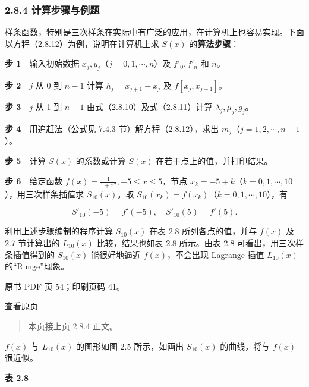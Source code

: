 \subsubsection{2.8.4 计算步骤与例题}\label{ch02b-ux8ba1ux7b97ux6b65ux9aa4ux4e0eux4f8bux9898}

样条函数，特别是三次样条在实际中有广泛的应用，在计算机上也容易实现。下面以方程（2.8.12）为例，说明在计算机上求 \(S(x)\) 的\textbf{算法步骤}：

\textbf{步 1}　输入初始数据 \(x_j,y_j\)（\(j=0,1,\cdots,n\)）及 \(f'_0,f'_n\) 和 \(n\)。

\textbf{步 2}　\(j\) 从 0 到 \(n-1\) 计算 \(h_j=x_{j+1}-x_j\) 及 \(f[x_j,x_{j+1}]\)。

\textbf{步 3}　\(j\) 从 1 到 \(n-1\) 由式（2.8.10）及式（2.8.11）计算 \(\lambda_j,\mu_j,g_j\)。

\textbf{步 4}　用追赶法（公式见 7.4.3 节）解方程（2.8.12），求出 \(m_j\)（\(j=1,2,\cdots,n-1\)）。

\textbf{步 5}　计算 \(S(x)\) 的系数或计算 \(S(x)\) 在若干点上的值，并打印结果。

\textbf{步 6}　给定函数 \(f(x)=\frac1{1+x^2},-5\leqslant x\leqslant5\)，节点 \(x_k=-5+k\)（\(k=0,1,\cdots,10\)），用三次样条插值求 \(S_{10}(x)\)。取 \(S_{10}(x_k)=f(x_k)\)（\(k=0,1,\cdots,10\)），有

\[S'_{10}(-5)=f'(-5),\quad S'_{10}(5)=f'(5).\]

利用上述步骤编制的程序计算 \(S_{10}(x)\) 在表 2.8 所列各点的值，并与 \(f(x)\) 及 2.7 节计算出的 \(L_{10}(x)\) 比较，结果也如表 2.8 所示。由表 2.8 可看出，用三次样条插值得到的 \(S_{10}(x)\) 能很好地逼近 \(f(x)\)，不会出现 Lagrange 插值 \(L_{10}(x)\) 的``Runge''现象。

\clearpage

原书 PDF 页 54；印刷页码 41。

\href{source-images/pdf-054.jpeg}{查看原页}

\begin{quote}
本页接上页 2.8.4 正文。
\end{quote}

\(f(x)\) 与 \(L_{10}(x)\) 的图形如图 2.5 所示，如画出 \(S_{10}(x)\) 的曲线，将与 \(f(x)\) 很近似。

\textbf{表 2.8}

